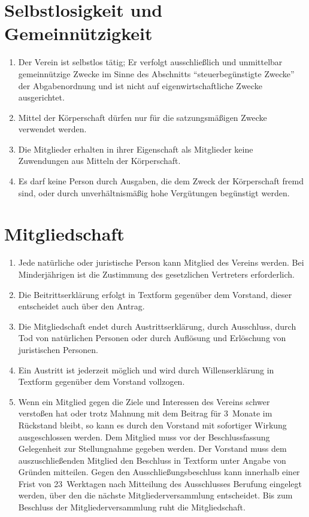 \documentclass[a4paper,12pt]{scrartcl}
\begin{document}
\section{Selbstlosigkeit und Gemeinnützigkeit}
\begin{enumerate}
  \item Der Verein ist selbstlos tätig; Er verfolgt ausschließlich und
    unmittelbar gemeinnützige Zwecke im Sinne des Abschnitts "`steuerbegünstigte
    Zwecke"' der Abgabenordnung und ist nicht auf eigenwirtschaftliche Zwecke
    ausgerichtet.
  \item Mittel der Körperschaft dürfen nur für die satzungsmäßigen Zwecke
    verwendet werden.
  \item Die Mitglieder erhalten in ihrer Eigenschaft als Mitglieder keine
    Zuwendungen aus Mitteln der Körperschaft.
  \item Es darf keine Person durch Ausgaben, die dem Zweck der Körperschaft
    fremd sind, oder durch unverhältnismäßig hohe Vergütungen begünstigt werden.
\end{enumerate}

\section{Mitgliedschaft}
\begin{enumerate}
  \item Jede natürliche oder juristische Person kann Mitglied des Vereins
    werden. Bei Minderjährigen ist die Zustimmung des gesetzlichen Vertreters
    erforderlich.
  \item Die Beitrittserklärung erfolgt in Textform gegenüber dem Vorstand,
    dieser entscheidet auch über den Antrag.
  \item Die Mitgliedschaft endet durch Austrittserklärung, durch Ausschluss,
    durch Tod von natürlichen Personen oder durch Auflösung und Erlöschung von
    juristischen Personen.
  \item Ein Austritt ist jederzeit möglich und wird durch Willenserklärung in
    Textform gegenüber dem Vorstand vollzogen.
  \item Wenn ein Mitglied gegen die Ziele und Interessen des Vereins schwer
    verstoßen hat oder trotz Mahnung mit dem Beitrag für 3~Monate im Rückstand
    bleibt, so kann es durch den Vorstand mit sofortiger Wirkung ausgeschlossen
    werden. Dem Mitglied muss vor der Beschlussfassung Gelegenheit zur
    Stellungnahme gegeben werden. Der Vorstand muss dem auszuschließenden
    Mitglied den Beschluss in Textform unter Angabe von Gründen mitteilen. Gegen
    den Ausschließungsbeschluss kann innerhalb einer Frist von 23~Werktagen nach
    Mitteilung des Ausschlusses Berufung eingelegt werden, über den die nächste
    Mitgliederversammlung entscheidet. Bis zum Beschluss der
    Mitgliederversammlung ruht die Mitgliedschaft.
\end{enumerate}
\end{document}
